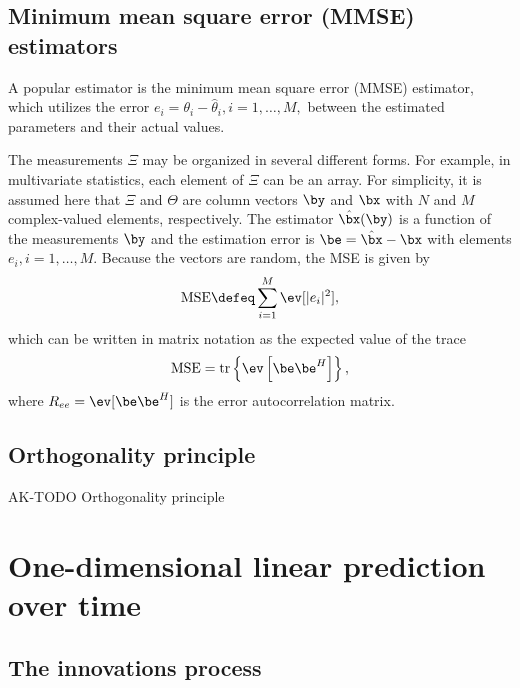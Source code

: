 \subsection{Minimum mean square error (MMSE) estimators}

A popular estimator is the minimum mean square error (MMSE) estimator, which utilizes the error $e_i = \theta_i - \hat \theta_i, i=1,\ldots,M,$ between the estimated parameters and their actual values.

The measurements $\Xi$ may be organized in several different forms.
For example, in multivariate statistics, each element of $\Xi$ can be an array.
For simplicity, it is assumed here that $\Xi$ and $\Theta$ are column vectors $\by$ and
$\bx$ with $N$ and $M$ complex-valued elements, respectively. The estimator $\hat \bx(\by)$ is a function
 of the measurements $\by$ and the estimation error is $\be = \hat \bx - \bx$ with elements $e_i, i=1,\ldots,M$. Because the vectors are random, the MSE is given by
\begin{equation}
\textrm{MSE} \defeq \sum_{i=1}^M \ev[|e_i|^2],
\label{eq:mseDefinition}
\end{equation}
which can be written in matrix notation as the expected value of the trace
\begin{equation}
\textrm{MSE} = \textrm{tr} \left\{ \ev \left[ \be \be^H  \right] \right\},
\end{equation}
where $R_{ee} = \ev [ \be \be^H  ]$ is the error autocorrelation matrix.


\subsection{Orthogonality principle}

AK-TODO Orthogonality principle

\section{One-dimensional linear prediction over time}
\label{app:1dtimeprediction}


\subsection{The innovations process}

